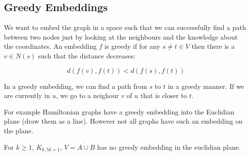 \subsection{Greedy Embeddings}

We want to embed the graph in a space such that we can successfully find a path between two nodes just by looking at the neighbours and the knowledge about the coordinates. An embedding $f$ is greedy if for any $s\neq t\in V$ then there is a $v\in N(s)$ such that the distance decreases:

\[d(f(v),f(t)) < d(f(s),f(t))\]

In a greedy embedding, we can find a path from $s$ to $t$ in a greedy manner. If we are currently in $u$, we go to a neighour $v$ of $u$ that is closer to $t$.

For example Hamiltonian graphs have a greedy embedding into the Euclidian plane (draw them as a line). However not all graphs have such an embedding on the plane.

\begin{lem}  For $k\geq 1$, $K_{k,5k+1}$, $V=A\dot \cup B$ has no greedy embedding in the euclidian plane. 
\end{lem}

